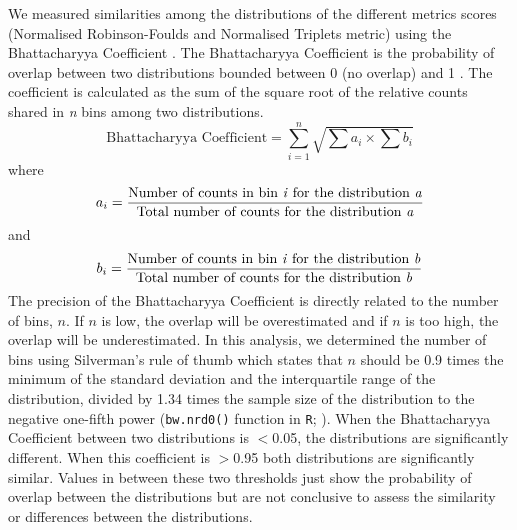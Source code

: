 We measured similarities among the distributions of the different metrics scores (Normalised Robinson-Foulds and Normalised Triplets metric) using the Bhattacharyya Coefficient \citep{Bhattacharyya}.
The Bhattacharyya Coefficient is the probability of overlap between two distributions bounded between 0 (no overlap) and 1 \citep[full overlap;][]{Bhattacharyya}.
The coefficient is calculated as the sum of the square root of the relative counts shared in \textit{n} bins among two distributions.
\begin{equation}
\text{Bhattacharyya Coefficient}=\sum_{i=1}^{n} \sqrt{{\sum{a_i}}\times{\sum{b_i}}}
\end{equation}
where
\begin{equation}
{a_i}=\frac{\text{Number of counts in bin \textit{i} for the distribution \textit{a}}}{\text{Total number of counts for the distribution \textit{a}}}
\end{equation}
and
\begin{equation}
{b_i}=\frac{\text{Number of counts in bin \textit{i} for the distribution \textit{b}}}{\text{Total number of counts for the distribution \textit{b}}}
\end{equation}
The precision of the Bhattacharyya Coefficient is directly related to the number of bins, $n$. If $n$ is low, the overlap will be overestimated and if $n$ is too high, the overlap will be underestimated. In this analysis, we determined the number of bins using Silverman's rule of thumb which states that $n$ should be 0.9 times the minimum of the standard deviation and the interquartile range of the distribution, divided by 1.34 times the sample size of the distribution to the negative one-fifth power (\texttt{bw.nrd0()} function in \texttt{R}; \citealt{silverman1986density}).
When the Bhattacharyya Coefficient between two distributions is $<$0.05, the distributions are significantly different.
When this coefficient is $>$0.95 both distributions are significantly similar.
Values in between these two thresholds just show the probability of overlap between the distributions but are not conclusive to assess the similarity or differences between the distributions.

